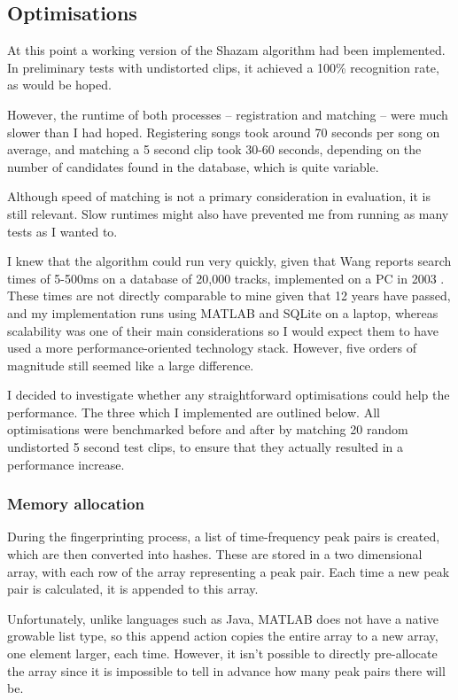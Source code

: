 \documentclass[12pt,a4paper,twoside,openright]{report}
\begin{document}
\subsection{Optimisations}
\label{section:shazamoptimisations}

At this point a working version of the Shazam algorithm had been implemented. In preliminary tests with undistorted clips, it achieved a 100\% recognition rate, as would be hoped.

However, the runtime of both processes -- registration and matching -- were much slower than I had hoped. Registering songs took around 70 seconds per song on average, and matching a 5 second clip took 30-60 seconds, depending on the number of candidates found in the database, which is quite variable.

Although speed of matching is not a primary consideration in evaluation, it is still relevant. Slow runtimes might also have prevented me from running as many tests as I wanted to. 

I knew that the algorithm could run very quickly, given that Wang reports search times of 5-500ms on a database of 20,000 tracks, implemented on a PC in 2003 \cite{Wang03}. These times are not directly comparable to mine given that 12 years have passed, and my implementation runs using MATLAB and SQLite on a laptop, whereas scalability was one of their main considerations so I would expect them to have used a more performance-oriented technology stack. However, five orders of magnitude still seemed like a large difference. 

I decided to investigate whether any straightforward optimisations could help the performance. The three which I implemented are outlined below. All optimisations were benchmarked before and after by matching 20 random undistorted 5 second test clips, to ensure that they actually resulted in a performance increase.

\subsubsection{Memory allocation}

During the fingerprinting process, a list of time-frequency peak pairs is created, which are then converted into hashes. These are stored in a two dimensional array, with each row of the array representing a peak pair. Each time a new peak pair is calculated, it is appended to this array.

Unfortunately, unlike languages such as Java, MATLAB does not have a native growable list type, so this append action copies the entire array to a new array, one element larger, each time. However, it isn't possible to directly pre-allocate the array since it is impossible to tell in advance how many peak pairs there will be.
\end{document}
